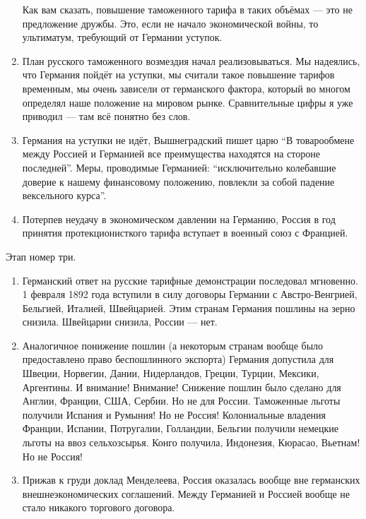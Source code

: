 \begin{enumerate}
Как вам сказать, повышение таможенного тарифа в таких объёмах --- это не
предложение дружбы. Это, если не начало экономической войны, то ультиматум,
требующий от Германии уступок.

\item План русского таможенного возмездия начал реализовываться. Мы надеялись,
что Германия пойдёт на уступки, мы считали такое повышение тарифов временным,
мы очень зависели от германского фактора, который во многом определял наше
положение на мировом рынке. Сравнительные цифры я уже приводил --- там всё
понятно без слов.

\item Германия на уступки не идёт, Вышнеградский пишет царю \enquote{В товарообмене
между Россией и Германией все преимущества находятся на стороне последней}.
Меры, проводимые Германией: \enquote{исключительно колебавшие доверие к нашему
финансовому положению, повлекли за собой падение вексельного курса}.

\item Потерпев неудачу в экономическом давлении на Германию, Россия в год
принятия протекционисткого тарифа вступает в военный союз с Францией.
\end{enumerate}

\vspace{1ex}\noindent
Этап номер три.

\begin{enumerate}
\item Германский ответ на русские тарифные демонстрации последовал мгновенно.
1 февраля 1892 года вступили в силу договоры Германии с Австро-Венгрией,
Бельгией, Италией, Швейцарией. Этим странам Германия пошлины на зерно снизила.
Швейцарии снизила, России --- нет.

\item Аналогичное понижение пошлин (а некоторым странам вообще было
предоставлено право беспошлинного экспорта) Германия допустила для Швеции,
Норвегии, Дании, Нидерландов, Греции, Турции, Мексики, Аргентины. И внимание!
Внимание! Снижение пошлин было сделано для Англии, Франции, США, Сербии. Но не
для России. Таможенные льготы получили Испания и Румыния! Но не Россия!
Колониальные владения Франции, Испании, Потругалии, Голландии, Бельгии получили
немецкие льготы на ввоз сельхозсырья. Конго получила, Индонезия, Кюрасао,
Вьетнам! Но не Россия!

\item Прижав к груди доклад Менделеева, Россия оказалась вообще вне германских
внешнеэкономических соглашений. Между Германией и Россией вообще не стало
никакого торгового договора.
\end{enumerate}

